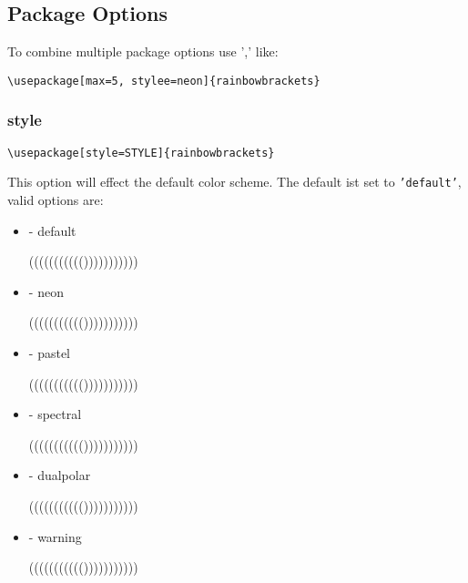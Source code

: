 \documentclass[10pt, a4paper]{article}
\newenvironment{itemizeexample}{
	\begin{itemize}
		\setlength\itemsep{-.5em}
	}
	{
	\end{itemize}
}
\begin{document}
	\subsection{Package Options}
	To combine multiple package options use ',' like:
	\begin{lstlisting}[style=A]
			\usepackage[max=5, stylee=neon]{rainbowbrackets}
	\end{lstlisting}
	\subsubsection{style}\label{sub:style}
	\begin{lstlisting}[style=A]
			\usepackage[style=STYLE]{rainbowbrackets}
	\end{lstlisting}
	This option will effect the default color scheme. The default ist set to \texttt{'default'}, valid options are:
	\begin{itemizeexample}
		\item[-] default \begin{rb}((((((((((()))))))))))\end{rb}
		\item[-] neon \begin{rb}((((((((((()))))))))))\end{rb}
		\item[-] pastel \begin{rb}((((((((((()))))))))))\end{rb}
		\item[-] spectral \begin{rb}((((((((((()))))))))))\end{rb}
		\item[-] dualpolar \begin{rb}((((((((((()))))))))))\end{rb}
		\item[-] warning \begin{rb}((((((((((()))))))))))\end{rb}\resetrbstyle
	\end{itemizeexample}
\end{document}
